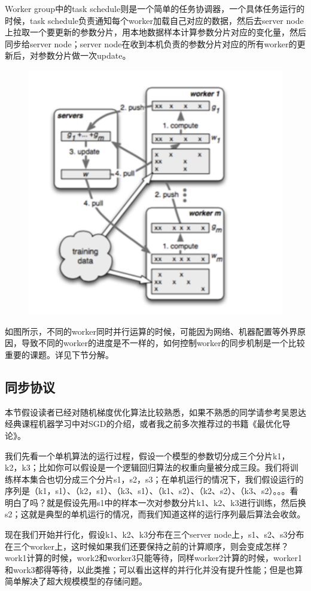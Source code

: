 \documentclass[12pt]{article}
\begin{document}
Worker group中的task schedule则是一个简单的任务协调器，一个具体任务运行的时候，task schedule负责通知每个worker加载自己对应的数据，然后去server node上拉取一个要更新的参数分片，用本地数据样本计算参数分片对应的变化量，然后同步给server node；server node在收到本机负责的参数分片对应的所有worker的更新后，对参数分片做一次update。
\begin{figure}[H]
    \centering
    \includegraphics[width=.6\textwidth]{fig/Large_Scale_Parameter_Server_Epoch_3_Worker.png}
\end{figure}
如图所示，不同的worker同时并行运算的时候，可能因为网络、机器配置等外界原因，导致不同的worker的进度是不一样的，如何控制worker的同步机制是一个比较重要的课题。详见下节分解。

\subsection{同步协议}
本节假设读者已经对随机梯度优化算法比较熟悉，如果不熟悉的同学请参考吴恩达经典课程机器学习中对SGD的介绍，或者我之前多次推荐过的书籍《最优化导论》。

我们先看一个单机算法的运行过程，假设一个模型的参数切分成三个分片k1，k2，k3；比如你可以假设是一个逻辑回归算法的权重向量被分成三段。我们将训练样本集合也切分成三个分片s1，s2，s3；在单机运行的情况下，我们假设运行的序列是（k1，s1）、（k2，s1）、（k3、s1）、（k1、s2）、（k2、s2）、（k3、s2）。。。看明白了吗？就是假设先用s1中的样本一次对参数分片k1、k2、k3进行训练，然后换s2；这就是典型的单机运行的情况，而我们知道这样的运行序列最后算法会收敛。

现在我们开始并行化，假设k1、k2、k3分布在三个server node上，s1、s2、s3分布在三个worker上，这时候如果我们还要保持之前的计算顺序，则会变成怎样？work1计算的时候，work2和worker3只能等待，同样worker2计算的时候，worker1和work3都得等待，以此类推；可以看出这样的并行化并没有提升性能；但是也算简单解决了超大规模模型的存储问题。
\end{document}
